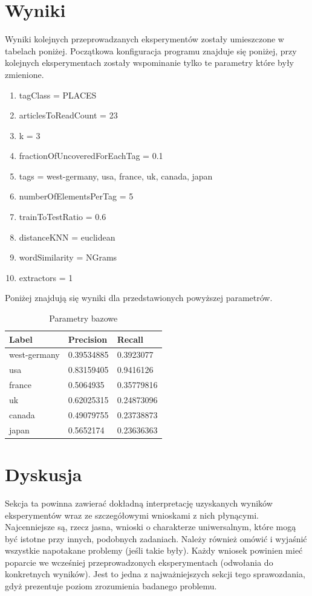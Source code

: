 \documentclass{classrep}
\begin{document}
\section{Wyniki}
Wyniki kolejnych przeprowadzanych eksperymentów zostały umieszczone w tabelach poniżej. Początkowa konfiguracja programu znajduje się poniżej, przy kolejnych eksperymentach zostały wspominanie tylko te parametry które były zmienione.
\begin{enumerate}
	\item tagClass = PLACES
	\item articlesToReadCount = 23
	\item k = 3
	\item fractionOfUncoveredForEachTag = 0.1
	\item tags = west-germany, usa, france, uk, canada, japan
	\item numberOfElementsPerTag = 5
	\item trainToTestRatio = 0.6
	\item distanceKNN = euclidean
	\item wordSimilarity = NGrams
	\item extractors = 1
\end{enumerate}
Poniżej znajdują się wyniki dla przedstawionych powyższej parametrów.
\begin{table}[H]
\begin{tabular}{|l|l|l|}
\hline
Label        & Precision  & Recall     \\ \hline
west-germany & 0.39534885 & 0.3923077  \\ \hline
usa          & 0.83159405 & 0.9416126  \\ \hline
france       & 0.5064935  & 0.35779816 \\ \hline
uk           & 0.62025315 & 0.24873096 \\ \hline
canada       & 0.49079755 & 0.23738873 \\ \hline
japan        & 0.5652174  & 0.23636363 \\ \hline
\end{tabular}
\caption{Parametry bazowe}
\end{table}

\section{Dyskusja}
{\color{blue}
Sekcja ta powinna zawierać dokładną interpretację uzyskanych wyników
eksperymentów wraz ze szczegółowymi wnioskami z nich płynącymi. Najcenniejsze
są, rzecz jasna, wnioski o charakterze uniwersalnym, które mogą być istotne
przy innych, podobnych zadaniach. Należy również omówić i wyjaśnić wszystkie
napotakane problemy (jeśli takie były). Każdy wniosek powinien mieć poparcie
we wcześniej przeprowadzonych eksperymentach (odwołania do konkretnych
wyników). Jest to jedna z najważniejszych sekcji tego sprawozdania, gdyż
prezentuje poziom zrozumienia badanego problemu.}
\end{document}
